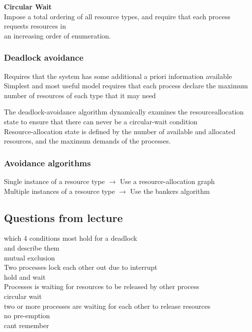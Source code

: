 \documentclass[a4paper,10pt,titlepage]{report}
\begin{document}
\textbf{Circular Wait} \\
\hspace{10mm}Impose a total ordering of all resource types, and require that each process
requests resources in \\
\hspace{10mm} an increasing order of enumeration.\\
\subsubsection{Deadlock avoidance}
Requires that the system has some additional a priori information available \\
Simplest and most useful model requires that each process declare the
maximum number of resources of each type that it may need
\\
\vspace{10mm}

The deadlock-avoidance algorithm dynamically examines the resourceallocation
state to ensure that there can never be a circular-wait condition
\\
Resource-allocation state is defined by the number of available and allocated
resources, and the maximum demands of the processes. \\

\subsubsection{Avoidance algorithms}
Single instance of a resource type $ \rightarrow $  Use a resource-allocation graph \\
Multiple instances of a resource type $ \rightarrow $ Use the bankers algorithm\\


\subsection{Questions from lecture}
which 4 conditions most hold for a deadlock\\
\hspace{10mm} and describe them \\
\hspace{10mm} mutual exclusion\\
\hspace{20mm} Two processes lock each other out due to interrupt  \\
\hspace{10mm} hold and wait\\
\hspace{20mm} Processes is waiting for resources to be released by other process \\
\hspace{10mm} circular wait\\
\hspace{20mm} two or more processes are waiting for each other to release resources \\
\hspace{10mm} no pre-emption\\
\hspace{20mm} cant remember \\
\end{document}
